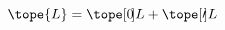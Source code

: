 \begin{equation}	\label{12.1}
\tope{L} = \tope[0\mspace{-3mu}]{L} + \tope[\prime\mspace{-3mu}]{L}
	\end{equation}

